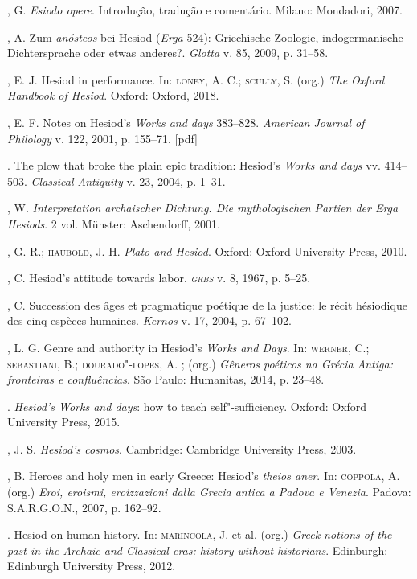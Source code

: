 \begin{bibliohedra}
, G. \emph{Esiodo opere}. Introdução, tradução e comentário.
Milano: Mondadori, 2007.

, A. Zum \emph{anósteos} bei Hesiod (\emph{Erga} 524):
Griechische Zoologie, indogermanische Dichtersprache oder etwas
anderes?. \emph{Glotta} v. 85, 2009, p. 31--58.

, E. J. Hesiod in performance. In: \textsc{loney}, A. C.; \textsc{scully}, S. (org.)
\emph{The Oxford Handbook of Hesiod}. Oxford: Oxford, 2018.

, E. F. Notes on Hesiod's \emph{Works and days} 383--828.
\emph{American Journal of Philology} v. 122, 2001, p. 155--71. {[}pdf{]}

\titidem. The plow that broke the plain epic tradition: Hesiod's \emph{Works
and days} vv. 414--503. \emph{Classical Antiquity} v. 23, 2004, p. 1--31.

, W. \emph{Interpretation archaischer Dichtung. Die mythologischen
Partien der Erga} \emph{Hesiods}. 2 vol. Münster: Aschendorff, 2001.

, G. R.; \textsc{haubold}, J. H. \emph{Plato and Hesiod}. Oxford:
Oxford University Press, 2010.

, C. Hesiod's attitude towards labor. \emph{\textsc{grbs}} v. 8,
1967, p. 5--25.

, C. Succession des âges et pragmatique poétique de la justice: le
récit hésiodique des cinq espèces humaines. \emph{Kernos} v. 17, 2004,
p. 67--102.

, L. G. Genre and authority in Hesiod's \emph{Works and Days}.
In: \textsc{werner}, C.; \textsc{sebastiani}, B.; \textsc{dourado"-lopes}, A. ; (org.) \emph{Gêneros
poéticos na Grécia Antiga: fronteiras e confluências}. São Paulo:
Humanitas, 2014, p. 23--48.

\titidem. \emph{Hesiod's Works and days}: how to teach self"-sufficiency.
Oxford: Oxford University Press, 2015.

, J. S. \emph{Hesiod's cosmos}. Cambridge: Cambridge University
Press, 2003.

, B. Heroes and holy men in early Greece: Hesiod's \emph{theios
aner}. In: \textsc{coppola}, A. (org.) \emph{Eroi, eroismi, eroizzazioni dalla
Grecia antica a Padova e Venezia}. Padova: S.A.R.G.O.N., 2007, p.
162--92.

\titidem. Hesiod on human history. In: \textsc{marincola}, J. et al. (org.) \emph{Greek
notions of the past in the Archaic and Classical eras: history without
historians}. Edinburgh: Edinburgh University Press, 2012.


\end{bibliohedra}
